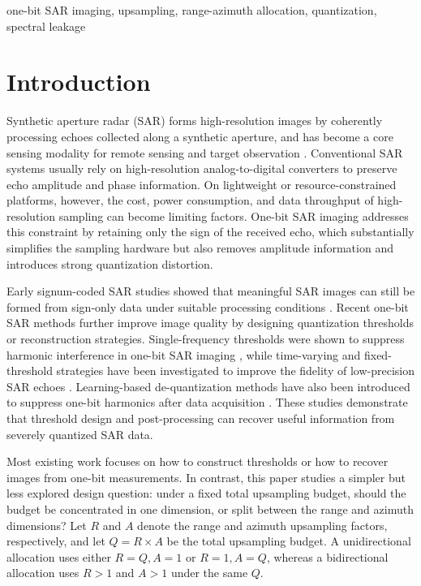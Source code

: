 \documentclass[conference]{IEEEtran}
\begin{document}
\begin{IEEEkeywords}
one-bit SAR imaging, upsampling, range-azimuth allocation, quantization, spectral leakage
\end{IEEEkeywords}

\section{Introduction}

Synthetic aperture radar (SAR) forms high-resolution images by coherently processing echoes collected along a synthetic aperture, and has become a core sensing modality for remote sensing and target observation \cite{cumming2005sar,curlander1991sar}. Conventional SAR systems usually rely on high-resolution analog-to-digital converters to preserve echo amplitude and phase information. On lightweight or resource-constrained platforms, however, the cost, power consumption, and data throughput of high-resolution sampling can become limiting factors. One-bit SAR imaging addresses this constraint by retaining only the sign of the received echo, which substantially simplifies the sampling hardware but also removes amplitude information and introduces strong quantization distortion.

Early signum-coded SAR studies showed that meaningful SAR images can still be formed from sign-only data under suitable processing conditions \cite{franceschetti1991signum}. Recent one-bit SAR methods further improve image quality by designing quantization thresholds or reconstruction strategies. Single-frequency thresholds were shown to suppress harmonic interference in one-bit SAR imaging \cite{zhao2019onebit}, while time-varying and fixed-threshold strategies have been investigated to improve the fidelity of low-precision SAR echoes \cite{demir2018onebit,zhao2021lowprecision,nie2025fixed}. Learning-based de-quantization methods have also been introduced to suppress one-bit harmonics after data acquisition \cite{si2023dequantization}. These studies demonstrate that threshold design and post-processing can recover useful information from severely quantized SAR data.

Most existing work focuses on how to construct thresholds or how to recover images from one-bit measurements. In contrast, this paper studies a simpler but less explored design question: under a fixed total upsampling budget, should the budget be concentrated in one dimension, or split between the range and azimuth dimensions? Let $R$ and $A$ denote the range and azimuth upsampling factors, respectively, and let $Q=R\times A$ be the total upsampling budget. A unidirectional allocation uses either $R=Q,A=1$ or $R=1,A=Q$, whereas a bidirectional allocation uses $R>1$ and $A>1$ under the same $Q$.
\end{document}

